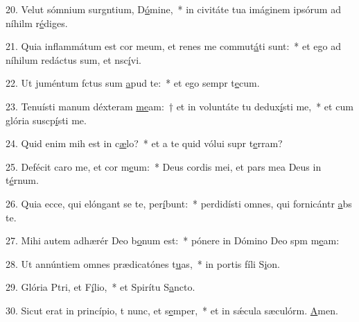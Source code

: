 20. Velut sómnium surgntium, D\uline{ó}mine,~* in civitáte tua imáginem ipsórum ad níhilm r\uline{é}diges.\par 
21. Quia inflammátum est cor meum, et renes me commut\uline{á}ti sunt:~* et ego ad níhilum redáctus sum, et nsc\uline{í}vi.\par 
22. Ut juméntum fctus sum \uline{a}pud te:~* et ego sempr t\uline{e}cum.\par 
23. Tenuísti manum déxteram \uline{me}am:~† et in voluntáte tu dedux\uline{í}sti me,~* et cum glória suscp\uline{í}sti me.\par 
24. Quid enim mih est in c\uline{æ}lo?~* et a te quid vólui supr t\uline{e}rram?\par 
25. Defécit caro me, et cor m\uline{e}um:~* Deus cordis mei, et pars mea Deus in t\uline{é}rnum.\par 
26. Quia ecce, qui elóngant se  te, per\uline{í}bunt:~* perdidísti omnes, qui fornicántr \uline{a}bs te.\par 
27. Mihi autem adhærér Deo b\uline{o}num est:~* pónere in Dómino Deo spm m\uline{e}am:\par 
28. Ut annúntiem omnes prædicatónes t\uline{u}as,~* in portis fíli S\uline{i}on.\par 
29. Glória Ptri, et F\uline{í}lio,~* et Spirítu S\uline{a}ncto.\par 
30. Sicut erat in princípio, t nunc, et s\uline{e}mper,~* et in sǽcula sæculórm. \uline{A}men.\par 
